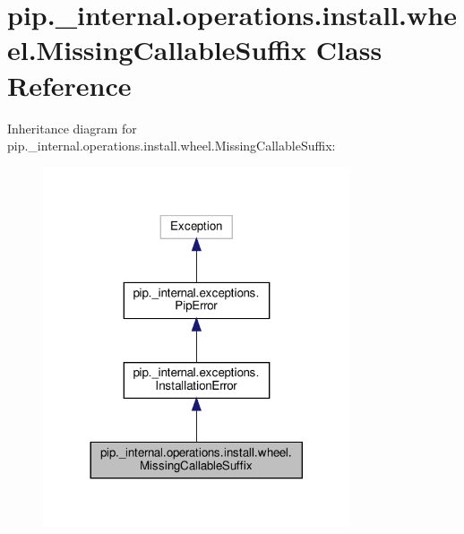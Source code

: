 \hypertarget{classpip_1_1__internal_1_1operations_1_1install_1_1wheel_1_1MissingCallableSuffix}{}\section{pip.\+\_\+internal.\+operations.\+install.\+wheel.\+Missing\+Callable\+Suffix Class Reference}
\label{classpip_1_1__internal_1_1operations_1_1install_1_1wheel_1_1MissingCallableSuffix}


Inheritance diagram for pip.\+\_\+internal.\+operations.\+install.\+wheel.\+Missing\+Callable\+Suffix\+:
\nopagebreak
\begin{figure}[H]
\begin{center}
\leavevmode
\includegraphics[width=257pt]{classpip_1_1__internal_1_1operations_1_1install_1_1wheel_1_1MissingCallableSuffix__inherit__graph}
\end{center}
\end{figure}


